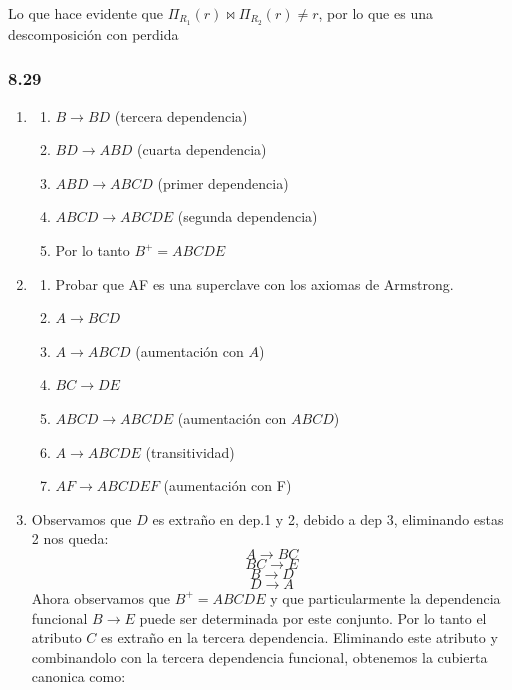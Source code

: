 \documentclass[twoside]{article}
\begin{document}
Lo que hace evidente que $\Pi_{R_1}(r) \bowtie \Pi_{R_2}(r) \neq r$, por lo que es una descomposici\'on con perdida

\subsubsection*{8.29}
\begin{enumerate}
      \item
            \begin{enumerate}
                  \item $B \rightarrow BD$ (tercera dependencia)
                  \item $BD \rightarrow ABD$ (cuarta dependencia)
                  \item $ABD \rightarrow ABCD$ (primer dependencia)
                  \item $ABCD \rightarrow ABCDE$ (segunda dependencia)
                  \item Por lo tanto $B^+ = ABCDE$
            \end{enumerate}
      \item
            \begin{enumerate}
                  \item Probar que AF es una superclave con los axiomas de Armstrong.
                  \item $A \rightarrow BCD$
                  \item $A \rightarrow ABCD$ (aumentación con $A$)
                  \item $BC \rightarrow DE$
                  \item $ABCD \rightarrow ABCDE$ (aumentación con $ABCD$)
                  \item $A \rightarrow ABCDE$ (transitividad)
                  \item $AF \rightarrow ABCDEF$ (aumentación con F)
            \end{enumerate}
      \item Observamos que $D$ es extraño en dep.1 y 2, debido a dep 3, eliminando estas 2 nos queda:
            $$A \rightarrow BC$$
            $$BC \rightarrow E$$
            $$B \rightarrow D$$
            $$D \rightarrow A$$
            Ahora observamos que $B^+ = ABCDE$ y que particularmente la dependencia funcional $B \rightarrow E$ puede
            ser determinada por este conjunto. Por lo tanto el atributo $C$ es extraño en la tercera dependencia.
            Eliminando este atributo y combinandolo con la tercera dependencia funcional, obtenemos la cubierta canonica como:

\end{enumerate}
\end{document}
